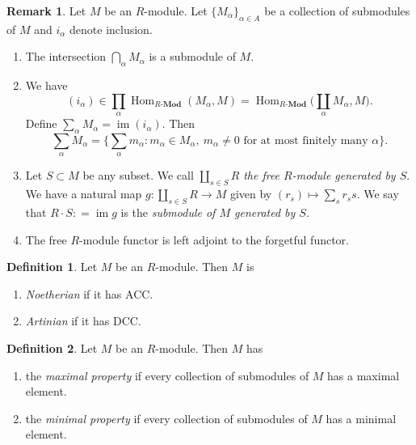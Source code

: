 \documentclass[10pt,letterpaper,cm]{nupset}
\theoremstyle{definition}
\newtheorem*{definition}{Definition}
\newtheorem{remark}{Remark}
\newcommand{\1}{\mathbf{1}}
\newcommand{\0}{\vec 0}
\DeclareMathOperator{\im}{im}
\DeclareMathOperator{\Hom}{Hom}
\begin{document}
\begin{remark} Let $M$ be an $R$-module. Let $\{M_{\alpha}\}_{\alpha \in A}$ be a collection of submodules of $M$ and $i_{\alpha}$ denote inclusion.
\begin{enumerate}
\item The intersection $\bigcap_{\alpha} M_{\alpha}$ is a submodule of $M$. 
\item We have $$(i_{\alpha}) \in \prod_{\alpha}\Hom_{R\text{-}\mathbf{Mod}}(M_{\alpha}, M) = \Hom_{R\text{-}\mathbf{Mod}}\big (\coprod_{\alpha} M_{\alpha}, M\big ).$$ Define $\sum_{\alpha} M_{\alpha} = \im (i_{\alpha})$. Then $$\sum_{\alpha} M_{\alpha}  = \{\sum_{\alpha} m_{\alpha} : m_{\alpha} \in M_{\alpha}, \ m_{\alpha} \ne 0 \text{ for at most finitely many } \alpha\}.$$
\item Let $S\subset M$ be any subset. We call $\coprod_{s\in S} R$ \textit{the free $R$-module generated by $S$}. We have a natural map $g : \coprod_{s\in S} R \to M$ given by $(r_s) \mapsto \sum_s r_ss$. We say that $R \cdot S: = \im g$ is the \textit{submodule of $M$ generated by $S$}.
\item The free $R$-module functor is left adjoint to the forgetful functor.
\end{enumerate}
\end{remark}

\begin{definition} Let $M$ be an $R$-module. Then $M$ is
\begin{enumerate}
\item \textit{Noetherian} if it has ACC.
\item \textit{Artinian} if it has DCC.
\end{enumerate}
\end{definition}

\begin{definition} Let $M$ be an $R$-module. Then $M$ has
\begin{enumerate}
\item the \textit{maximal property} if every collection of submodules of $M$ has a maximal element.
\item the \textit{minimal property} if every collection of submodules of $M$ has a minimal element.
\end{enumerate}
\end{definition}
\end{document}
